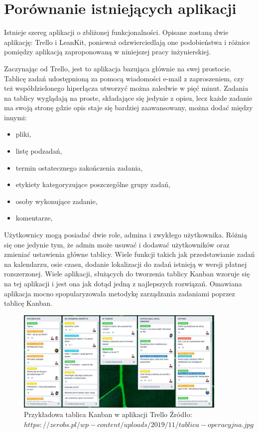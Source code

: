 \section{Porównanie istniejących aplikacji}
Istnieje szereg aplikacji o zbliżonej funkcjonalności. Opisane zostaną dwie aplikację: Trello i LeanKit,  ponieważ odzwierciedlają one podobieństwa i różnice pomiędzy aplikacją zaproponowaną w niniejszej pracy inżynierskiej.


Zaczynając od Trello, jest to aplikacja bazująca głównie na swej prostocie. Tablicę zadań udostępnioną za pomocą wiadomości e-mail z zaproszeniem, czy też współdzielonego hiperłącza utworzyć można zaledwie w pięć minut. Zadania na tablicy wyglądają na proste, składające się jedynie z opisu, lecz każde zadanie ma swoją stronę gdzie opis staje się bardziej zaawansowany, można dodać między innymi:
\begin{itemize}
	\item pliki, 
	\item listę podzadań,
	\item termin ostatecznego zakończenia zadania,
	\item etykiety kategoryzujące poszczególne grupy zadań,
	\item osoby wykonujące zadanie,
	\item komentarze,
\end{itemize}
Użytkownicy mogą posiadać dwie role, admina i zwykłego użytkownika. Różnią się one jedynie tym, że admin może usuwać i dodawać użytkowników oraz zmieniać ustawienia główne tablicy. Wiele funkcji takich jak przedstawianie zadań na kalendarzu, osie czasu, dodanie lokalizacji do zadań istnieją w wersji płatnej rozszerzonej. Wiele aplikacji, służących do tworzenia tablicy Kanban wzoruje się na tej aplikacji i jest ona jak dotąd jedną z najlepszych rozwiązań. Omawiana aplikacja mocno spopularyzowała metodykę zarządzania zadaniami poprzez tablicę Kanban.

\begin{figure}[h]
	\centering
	\includegraphics[width=0.90\textwidth]{tablica-operacyjna}		
	\caption{Przykładowa tablica Kanban w aplikacji Trello \newline Źródło: $https://zerobs.pl/wp-content/uploads/2019/11/tablica-operacyjna.jpg $}
\end{figure}

